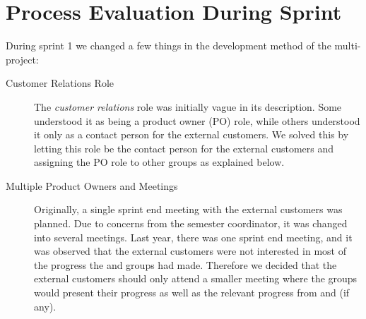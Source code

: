 \section{Process Evaluation During Sprint}\label{sec:s1_processeval}
During sprint 1 we changed a few things in the development method of the multi-project:

\begin{description}
  \item[Customer Relations Role] The \emph{customer relations} role was initially vague in its description. Some understood it as being a product owner (PO) role, while others understood it only as a contact person for the external customers. We solved this by letting this role be the contact person for the external customers and assigning the PO role to other groups as explained below.
  \item[Multiple Product Owners and Meetings] Originally, a single sprint end meeting with the external customers was planned. Due to concerns from the semester coordinator, it was changed into several meetings. Last year, there was one sprint end meeting, and it was observed that the external customers were not interested in most of the progress the \db and \bd groups had made. Therefore we decided that the external customers should only attend a smaller meeting where the \gui groups would present their progress as well as the relevant progress from \db and \bd (if any). 
  

\end{description}
